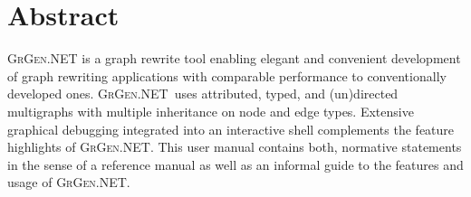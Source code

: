 \documentclass[a4paper,final,11pt]{book}
\providecommand{\GrG}{{\scshape GrGen.NET}}
\newcounter{example}
\begin{document}
\chapter*{Abstract}


\noindent \textsc{GrGen.NET} is a graph rewrite tool enabling elegant and convenient development of graph rewriting applications with comparable performance to conventionally developed ones.
\GrG\ uses attributed, typed, and (un)directed multigraphs with multiple inheritance on node and edge types.
Extensive graphical debugging integrated into an interactive shell complements the feature highlights of \GrG.
This user manual contains both, normative statements in the sense of a reference manual as well as an informal guide to the features and usage of \GrG.\\[6ex]



\clearpage

\tableofcontents





















%

\appendix




\printindex
\end{document}
